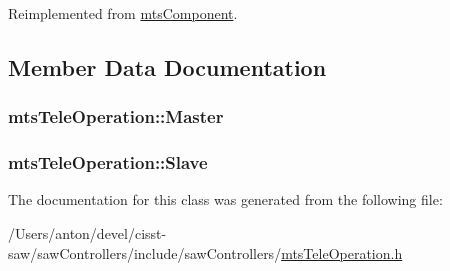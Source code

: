 Reimplemented from \hyperlink{classmts_component_aaf28f0262b44eb6866e10089a02fa6e4}{mts\+Component}.



\subsection{Member Data Documentation}
\hypertarget{classmts_tele_operation_ab6560f81ba718ab14e33e7e38cc33860}{}
\subsubsection[{Master}]{ mts\+Tele\+Operation\+::\+Master\hspace{0.3cm}{\ttfamily [protected]}}\label{classmts_tele_operation_ab6560f81ba718ab14e33e7e38cc33860}
\hypertarget{classmts_tele_operation_a7199e0f2fd813b121f3a5a84aa61ee7b}{}
\subsubsection[{Slave}]{ mts\+Tele\+Operation\+::\+Slave\hspace{0.3cm}{\ttfamily [protected]}}\label{classmts_tele_operation_a7199e0f2fd813b121f3a5a84aa61ee7b}


The documentation for this class was generated from the following file\+:\begin{DoxyCompactItemize}
\item 
/\+Users/anton/devel/cisst-\/saw/saw\+Controllers/include/saw\+Controllers/\hyperlink{mts_tele_operation_8h}{mts\+Tele\+Operation.\+h}\end{DoxyCompactItemize}
